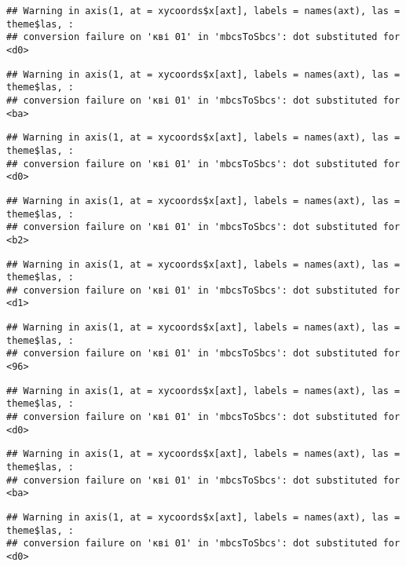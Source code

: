 \documentclass[]{article}
\begin{document}
\begin{verbatim}
## Warning in axis(1, at = xycoords$x[axt], labels = names(axt), las = theme$las, :
## conversion failure on 'кві 01' in 'mbcsToSbcs': dot substituted for <d0>
\end{verbatim}

\begin{verbatim}
## Warning in axis(1, at = xycoords$x[axt], labels = names(axt), las = theme$las, :
## conversion failure on 'кві 01' in 'mbcsToSbcs': dot substituted for <ba>
\end{verbatim}

\begin{verbatim}
## Warning in axis(1, at = xycoords$x[axt], labels = names(axt), las = theme$las, :
## conversion failure on 'кві 01' in 'mbcsToSbcs': dot substituted for <d0>
\end{verbatim}

\begin{verbatim}
## Warning in axis(1, at = xycoords$x[axt], labels = names(axt), las = theme$las, :
## conversion failure on 'кві 01' in 'mbcsToSbcs': dot substituted for <b2>
\end{verbatim}

\begin{verbatim}
## Warning in axis(1, at = xycoords$x[axt], labels = names(axt), las = theme$las, :
## conversion failure on 'кві 01' in 'mbcsToSbcs': dot substituted for <d1>
\end{verbatim}

\begin{verbatim}
## Warning in axis(1, at = xycoords$x[axt], labels = names(axt), las = theme$las, :
## conversion failure on 'кві 01' in 'mbcsToSbcs': dot substituted for <96>
\end{verbatim}

\begin{verbatim}
## Warning in axis(1, at = xycoords$x[axt], labels = names(axt), las = theme$las, :
## conversion failure on 'кві 01' in 'mbcsToSbcs': dot substituted for <d0>
\end{verbatim}

\begin{verbatim}
## Warning in axis(1, at = xycoords$x[axt], labels = names(axt), las = theme$las, :
## conversion failure on 'кві 01' in 'mbcsToSbcs': dot substituted for <ba>
\end{verbatim}

\begin{verbatim}
## Warning in axis(1, at = xycoords$x[axt], labels = names(axt), las = theme$las, :
## conversion failure on 'кві 01' in 'mbcsToSbcs': dot substituted for <d0>
\end{verbatim}
\end{document}
